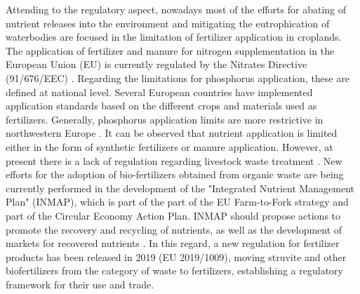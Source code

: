 \begin{refsection}[referencesCh1]
Attending to the regulatory aspect, nowadays most of the efforts for abating of nutrient releases into the environment and mitigating the eutrophication of waterbodies are focused in the limitation of fertilizer application in croplands. The application of fertilizer and manure for nitrogen supplementation in the European Union (EU) is currently regulated by the Nitrates Directive (91/676/EEC) \citep{GRIZZETTI2021102281}. Regarding the limitations for phosphorus application, these are defined at national level. Several European countries have implemented application standards based on the different crops and materials used as fertilizers. Generally, phosphorus application limits are more restrictive in northwestern Europe \citep{amery2014agricultural}. It can be observed that nutrient application is limited either in the form of synthetic fertilizers or manure application. However, at present there is a lack of regulation regarding livestock waste treatment \citep{Piot_Lepetit2012}. New efforts for the adoption of bio-fertilizers obtained from organic waste are being currently performed in the development of the "Integrated Nutrient Management Plan" (INMAP), which is part of the part of the EU Farm-to-Fork strategy and part of the Circular Economy Action Plan. INMAP should propose actions to promote the recovery and recycling of nutrients, as well as the development of markets for recovered nutrients \citep{ESSP2021, CircularEconomyActionPlan}. In this regard, a new regulation for fertilizer products has been released in 2019 (EU 2019/1009), moving struvite and other biofertilizers from the category of waste to fertilizers, establishing a regulatory framework for their use and trade.


\end{refsection}
